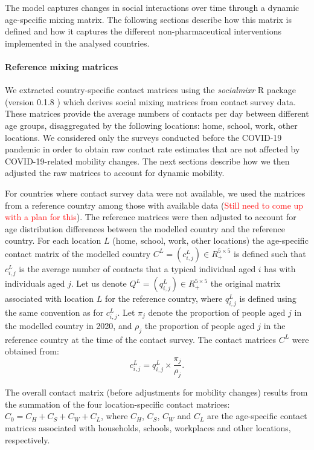 The model captures changes in social interactions over time through a dynamic age-specific mixing matrix. The following
sections describe how this matrix is defined and how it captures the different non-pharmaceutical interventions implemented
in the analysed countries.

\paragraph{Reference mixing matrices}
We extracted country-specific contact matrices using the \textit{socialmixr} R package (version 0.1.8 ) which derives social mixing matrices from 
contact survey data. These matrices provide the average numbers of contacts per day between different age groups, disaggregated by the following 
locations: home, school, work, other locations. We considered only the surveys conducted before the COVID-19 pandemic in order to obtain 
raw contact rate estimates that are not affected by COVID-19-related mobility changes. The next sections describe how we then adjusted 
the raw matrices to account for dynamic mobility.

For countries where contact survey data were not available, we used the matrices from a reference country among 
those with available data (\textcolor{red}{Still need to come up with a plan for this}). The reference matrices were 
then adjusted to account for age distribution differences between the modelled country and the reference country. For each 
location $L$ (home, school, work, other locations) the age-specific contact matrix of the modelled country $C^L = (c_{i,j}^L) \in R_{+}^{5 \times 5}$ 
is defined such that $c_{i,j}^L$ is the average number of contacts that a typical individual aged $i$ has with individuals aged $j$. 
Let us denote $Q^L = (q_{i,j}^L) \in R_{+}^{5 \times 5}$ the original matrix associated with location $L$ for the reference country, where $q_{i,j}^L$ is defined using the same 
convention as for $c_{i,j}^L$. Let $\pi_j$ denote the proportion of people aged $j$ in the modelled country in 2020, and $\rho_j$ the proportion of people aged $j$ in the reference country 
at the time of the contact survey. 
The contact matrices $C^L$ were obtained from:
$$
c_{i,j}^L = q_{i,j}^L \times \frac{\pi_j}{\rho_j} . 
$$

The overall contact matrix (before adjustments for mobility changes) results from the summation of the four location-specific 
contact matrices: \(C_{0}=C_{H}+C_{S}+C_{W}+C_{L}\), where \(C_{H}\), \(C_{S}\), \(C_{W}\) and \(C_{L}\) are the age-specific
contact matrices associated with households, schools, workplaces and other locations, respectively.

